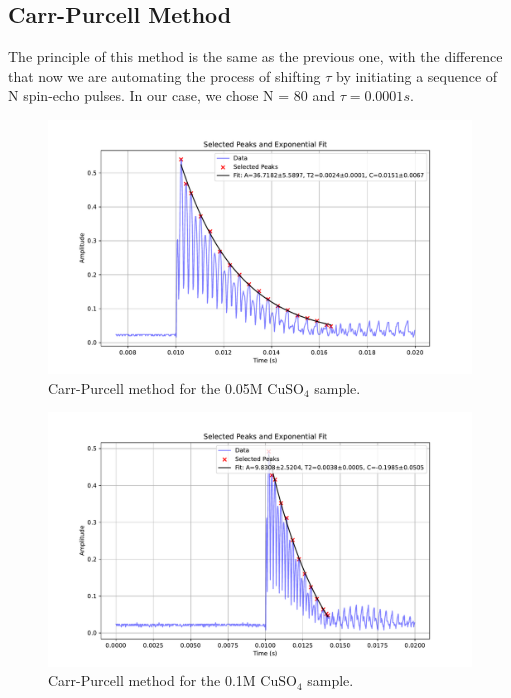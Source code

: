 \documentclass[12pt]{article}
\begin{document}
\subsection{Carr-Purcell Method}
The principle of this method is the same as the previous one, with the difference that now we are automating the process of shifting $\tau$ by initiating a sequence of N spin-echo pulses.
In our case, we chose N = 80 and $\tau = 0.0001s$.

\begin{figure}[H]
  \includegraphics[scale = 0.5]{CP_0.05.pdf}
  \caption{Carr-Purcell method for the 0.05M $\text{CuSO}_4$ sample.}
  \label{CP_0.05.pdf}
\end{figure}
\begin{figure}[H]
  \includegraphics[scale = 0.5]{CP_0.1.pdf}
  \caption{Carr-Purcell method for the 0.1M $\text{CuSO}_4$ sample.}
  \label{CP_0.1.pdf}
\end{figure}
\end{document}
